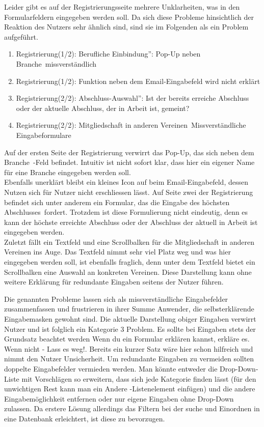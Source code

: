 { Leider gibt es auf der Registrierungsseite mehrere Unklarheiten, was in den Formularfeldern eingegeben werden soll. Da sich diese Probleme hinsichtlich der Reaktion
des Nutzers sehr ähnlich sind, sind sie im Folgenden als ein Problem aufgeführt.
\begin{enumerate}
	\item {Registrierung(1/2): \glqq Berufliche Einbindung”: Pop-Up neben \glqq Branche\grqq ~missverständlich}
	\item {Registrierung(1/2): Funktion neben dem Email-Eingabefeld wird nicht erklärt}
	\item {Registrierung(2/2): \glqq Abschluss-Auswahl”: Ist der bereits erreiche Abschluss oder der aktuelle Abschluss, der in Arbeit ist, gemeint? }
	\item {Registrierung(2/2): \glqq Mitgliedschaft in anderen Vereinen\grqq ~Missverständliche Eingabeformulare}	
\end{enumerate}	
Auf der ersten Seite der Registrierung verwirrt das Pop-Up, das sich neben dem \glqq Branche\grqq ~-Feld befindet. Intuitiv ist nicht sofort klar, dass hier ein eigener
Name für eine Branche eingegeben werden soll.\\
Ebenfalls unerklärt bleibt ein kleines Icon auf beim Email-Eingabefeld, dessen Nutzen sich für Nutzer nicht erschliessen lässt.
Auf Seite zwei der Registrierung befindet sich unter anderem ein Formular, das die Eingabe des \glqq höchsten Abschlusses\grqq ~fordert. Trotzdem ist diese Formulierung nicht eindeutig,
denn es kann der höchste erreichte Abschluss oder der Abschluss der aktuell in Arbeit ist eingegeben werden.\\
Zuletzt fällt ein Textfeld und eine Scrollbalken für die Mitgliedschaft in anderen Vereinen ins Auge. Das Textfeld nimmt sehr viel Platz weg und was hier eingegeben werden soll, ist ebenfalls fraglich, denn unter dem Textfeld bietet ein Scrollbalken eine Auswahl an konkreten Vereinen. Diese Darstellung kann ohne weitere Erklärung für redundante Eingaben seitens der Nutzer führen.
}
{ Die genannten Probleme lassen sich als missverständliche Eingabefelder zusammenfassen und frustrieren in ihrer Summe Anwender, die selbsterklärende Eingabemasken gewohnt sind. Die aktuelle Darstellung obiger Eingaben verwirrt Nutzer und ist folglich ein Kategorie 3 Problem.
}
{ Es sollte bei Eingaben stets der Grundsatz beachtet werden \glqq Wenn du ein Formular erklären kannst, erkläre es. Wenn nicht - Lass es weg!\grqq. Bereits ein kurzer Satz wäre hier schon hilfreich und nimmt den Nutzer Unsicherheit. Um redundante Eingaben zu vermeiden sollten doppelte Eingabefelder vermieden werden. Man könnte entweder die Drop-Down-Liste mit Vorschlägen so erweitern, dass sich jede Kategorie finden lässt (für den unwichtigen Rest kann man ein \glqq Andere \grqq-Listenelement einfügen) und die andere Eingabemöglichkeit entfernen oder nur eigene Eingaben ohne Drop-Down zulassen. Da erstere Lösung allerdings das Filtern bei der suche und Einordnen in eine Datenbank erleichtert, ist diese zu bevorzugen.
}
  



